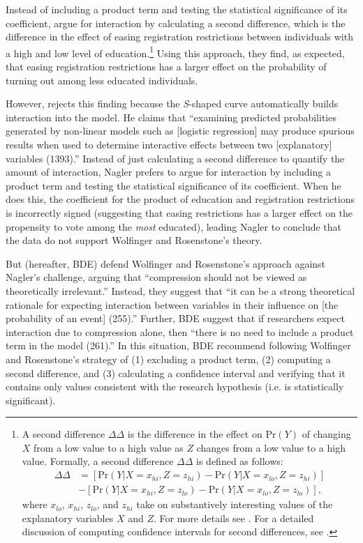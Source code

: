 \documentclass[12pt]{article}
\begin{document}
\noindent Instead of including a product term and testing the statistical significance of its coefficient, \cite{WolfingerRosenstone1980} argue for interaction by calculating a second difference, which is the difference in the effect of easing registration restrictions between individuals with a high and low level of education.\footnote{A second difference $\Delta\Delta$ is the difference in the effect on $\text{Pr}(Y)$ of changing $X$ from a low value to a high value as $Z$ changes from a low value to a high value. Formally, a second difference $\Delta\Delta$ is defined as follows:
\begin{align}
\Delta\Delta &= [\text{Pr}(Y | X = x_{hi}, Z = z_{hi}) - \text{Pr}(Y | X = x_{lo}, Z = z_{hi})]\nonumber \\
&-[\text{Pr}(Y  | X = x_{hi}, Z = z_{lo}) - \text{Pr}(Y  | X = x_{lo}, Z = z_{lo})], \nonumber
\end{align}
where $x_{lo}$, $x_{hi}$, $z_{lo}$, and $z_{hi}$ take on substantively interesting values of the explanatory variables $X$ and $Z$. For more details see \cite{BerryDeMerittEsarey2010}. For a detailed discussion of computing confidence intervals for second differences, see \cite{KingTomzWhittenburg2000}.}  Using this approach, they find, as expected, that easing registration restrictions has a larger effect on the probability of turning out among less educated individuals. 

However, \cite{Nagler1991} rejects this finding because the \textit{S}-shaped curve automatically builds interaction into the model. He claims that ``examining predicted probabilities generated by non-linear models such as [logistic regression] may produce spurious results when used to determine interactive effects between two [explanatory] variables (1393).'' Instead of just calculating a second difference to quantify the amount of interaction, Nagler prefers to argue for interaction by including a product term and testing the statistical significance of its coefficient.  When he does this, the coefficient for the product of education and registration restrictions is incorrectly signed (suggesting that easing restrictions has a larger effect on the propensity to vote among the \textit{most} educated), leading Nagler to conclude that the data do not support Wolfinger and Rosenstone's theory. 

But \cite{BerryDeMerittEsarey2010} (hereafter, BDE) defend Wolfinger and Rosenstone's approach against Nagler's challenge, arguing that ``compression should not be viewed as theoretically irrelevant.'' Instead, they suggest that ``it can be a strong theoretical rationale for expecting interaction between variables in their influence on [the probability of an event] (255).'' Further, BDE suggest that if researchers expect interaction due to compression alone, then ``there is no need to include a product term in the model (261).'' In this situation, BDE recommend following Wolfinger and Rosenstone's strategy of (1) excluding a product term, (2) computing a second difference, and (3) calculating a confidence interval and verifying that it contains only values consistent with the research hypothesis (i.e. is statistically significant). 
\end{document}
